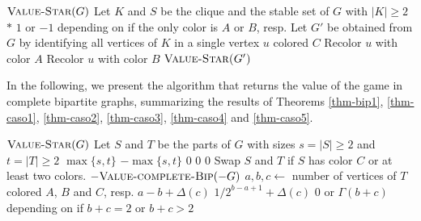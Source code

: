 \documentclass[a4paper,11pt]{article}
\begin{document}
\begin{algorithm}
\caption{Value of the game in Complete Split Graphs}\label{alg-split}
\begin{algorithmic}[1]
 \Return $\textsc{Value-Star}(G)$\EndIf
\State Let $K$ and $S$ be the clique and the stable set of $G$ with $|K|\geq 2$
     \Return $*$\EndIf
    \State\Return $1$ or $-1$ depending on if the only color is $A$ or $B$, resp.
\EndIf
\State Let $G'$ be obtained from $G$ by identifying all vertices of $K$ in a single vertex $u$ colored $C$
 Recolor $u$ with color $A$\EndIf
{} Recolor $u$ with color $B$\EndIf
\State \Return $\textsc{Value-Star($G'$)}$
\EndProcedure
\end{algorithmic}
\end{algorithm}



In the following, we present the algorithm that returns the value of the game in complete bipartite graphs, summarizing the results of Theorems \ref{thm-bip1}, \ref{thm-caso1}, \ref{thm-caso2}, \ref{thm-caso3}, \ref{thm-caso4} and \ref{thm-caso5}.

\begin{algorithm}
\caption{Value of the game in Complete Bipartite Graphs}\label{alg-bip}
\begin{algorithmic}[1]
 \Return $\textsc{Value-Star}(G)$\EndIf
\State Let $S$ and $T$ be the parts of $G$ with sizes $s=|S|\geq 2$ and $t=|T|\geq 2$
 \Return $\max\{s,t\}$\EndIf
{} \Return $-\max\{s,t\}$\EndIf
{} \Return $0$\EndIf
{} \Return $0$\EndIf
{} \Return $0$\EndIf
\State Swap $S$ and $T$ if $S$ has color $C$ or at least two colors.
 \Return $-\textsc{Value-complete-Bip}(-G)$\EndIf
\State $a,b,c\gets$ number of vertices of $T$ colored $A$, $B$ and $C$, resp.
 \Return $a-b+\Delta(c)$ \EndIf
{} \Return $1/2^{b-a+1}+\Delta(c)$ \EndIf
{} \Return $0$ or $\Gamma(b+c)$ depending on if $b+c=2$ or $b+c>2$\EndIf
\EndProcedure
\end{algorithmic}
\end{algorithm}




\end{document}
